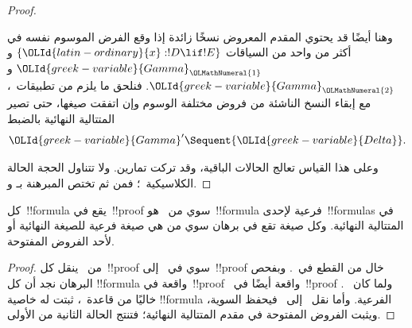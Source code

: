 \documentclass[../../../include/open-logic-section]{subfiles}
\begin{document}
\begin{proof}
\begin{enumerate}
  وهنا أيضًا قد يحتوي المقدم المعروض نسخًا زائدة إذا وقع الفرض الموسوم
  نفسه في أكثر من واحد من السياقات
  $\{{\OLId{latin-ordinary}{x}}:!D \lif !E\}$ و${\OLId{greek-variable}{Gamma}}_{\OLMathNumeral{1}}$ و${\OLId{greek-variable}{Gamma}}_{\OLMathNumeral{2}}$. فنلحق ما يلزم من
  تطبيقات~\LeftR{\Contraction}، مع إبقاء النسخ الناشئة من فروض مختلفة
  الوسوم وإن اتفقت صيغها، حتى تصير المتتالية النهائية بالضبط
  \[
  {\OLId{greek-variable}{Gamma}}' \Sequent {\OLId{greek-variable}{Delta}}.
  \]

\end{enumerate}
وعلى هذا القياس تعالج الحالات الباقية، وقد تركت تمارين. ولا تتناول الحجة
الحالة الكلاسيكية~\FalseCl؛ فمن ثم تختص المبرهنة بـ و.
\end{proof}

\begin{cor}
كل~!!{formula} يقع في~!!{proof} سوي من~ هو~!!{formula} فرعية
لإحدى~!!{formula}s في المتتالية النهائية. وكل صيغة تقع في برهان سوي من
 هي صيغة فرعية للصيغة النهائية أو لأحد الفروض المفتوحة.
\end{cor}

\begin{proof}
  من~ ينقل كل~!!{proof} سوي في~
  إلى~!!{proof} خال من القطع في~. وبفحص البرهان نجد أن كل
  !!{formula} واقعة في~!!{proof}~ واقعة أيضًا في~!!{proof}
  . ولما كان~ خاليًا من قاعدة~\Cut{}، ثبتت له خاصية
  !!{formula} الفرعية. وأما نقل~ إلى~ فيحفظ السوية،
  ويثبت الفروض المفتوحة في مقدم المتتالية النهائية؛ فتنتج الحالة الثانية
  من الأولى.
\end{proof}
\end{document}
